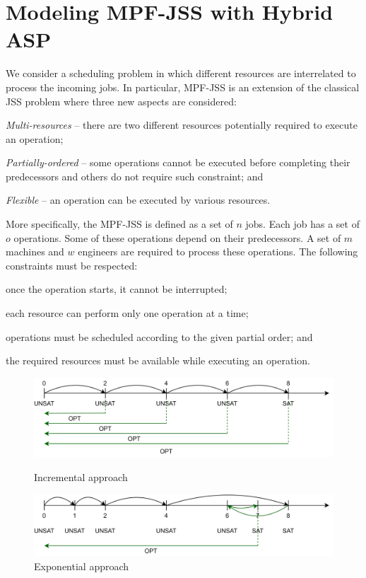 \documentclass[submission,copyright,creativecommons]{eptcs}
\begin{document}
\section{Modeling MPF-JSS with Hybrid ASP}\label{sec:aspmodeling}
We consider a scheduling problem in which different resources are interrelated to process the incoming jobs. In particular, MPF-JSS is an extension of the classical JSS problem where three new aspects are considered: 
\begin{enumerate*}[label=\emph{(\alph*)}]
	\item \emph{Multi-resources} -- there are two different resources potentially required to execute an operation; 
	\item \emph{Partially-ordered} -- some operations cannot be executed before completing their predecessors and others do not require such constraint; and
	\item \emph{Flexible} -- an operation can be executed by various resources. 
\end{enumerate*}
More specifically, the MPF-JSS is defined as a set of $n$ jobs. Each job has a set of $o$ operations. Some of these operations depend on their predecessors. A set of $m$ machines and $w$ engineers are required to process these operations. The following constraints must be respected:
\begin{enumerate*}[label=\emph{(\roman*)}]
  \item once the operation starts, it cannot be interrupted;
  \item each resource can perform only one operation at a time;
  \item operations must be scheduled according to the given partial order; and
  \item the required resources must be available while executing an operation.
\end{enumerate*}

\begin{figure}[bt]
	\centering
	\includegraphics[width=0.6\linewidth]{figures/incremental.pdf}
	\caption{Incremental approach \label{fig:inc}}
        \smallskip %
        \bigskip
	\includegraphics[width=0.6\linewidth]{figures/exponential.pdf}
	\caption{Exponential approach \label{fig:exp}}
\end{figure}
\end{document}
